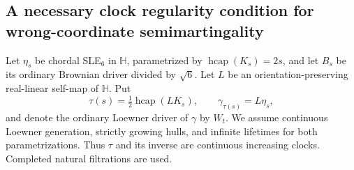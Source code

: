 \documentclass[11pt]{article}
\theoremstyle{definition}\newtheorem{definition}[theorem]{Definition}
\theoremstyle{remark}\newtheorem{remark}[theorem]{Remark}
\begin{document}
\subsection{A necessary clock regularity condition for wrong-coordinate semimartingality}
\label{sec:affine-clock-semimartingale-test}

Let $\eta_s$ be chordal SLE$_6$ in $\mathbb H$, parametrized by
$\operatorname{hcap}(K_s)=2s$, and let $B_s$ be its ordinary Brownian driver
divided by $\sqrt6$. Let $L$ be an orientation-preserving real-linear
self-map of $\mathbb H$. Put
\[
 \tau(s)=\tfrac12\operatorname{hcap}(LK_s),\qquad
 \gamma_{\tau(s)}=L\eta_s,
\]
and denote the ordinary Loewner driver of $\gamma$ by $W_t$.
We assume continuous Loewner generation, strictly growing hulls, and
infinite lifetimes for both parametrizations. Thus $\tau$ and its inverse
are continuous increasing clocks. Completed natural filtrations are used.
\end{document}
